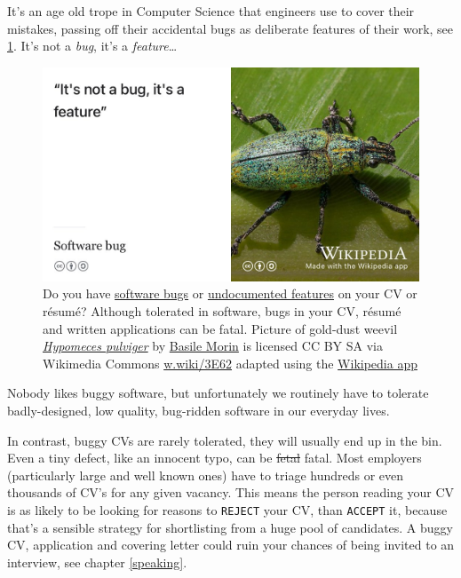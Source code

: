 \documentclass[
]{book}
\begin{document}
It's an age old trope in Computer Science that engineers use to cover their mistakes, passing off their accidental bugs as deliberate features of their work, see \ref{fig:notabug-fig}. It's not a \emph{bug}, it's a \emph{feature}\ldots{}

\begin{figure}

{\centering \includegraphics[width=0.99\linewidth]{images/notabug} 

}

\caption{Do you have \href{https://en.wikipedia.org/wiki/Software_bug}{software bugs} or \href{https://en.wikipedia.org/wiki/Undocumented_feature}{undocumented features} on your CV or résumé? Although tolerated in software, bugs in your CV, résumé and written applications can be fatal. Picture of gold-dust weevil \emph{\href{https://en.wikipedia.org/wiki/Hypomeces_pulviger}{Hypomeces pulviger}} by \href{https://commons.wikimedia.org/wiki/User:Basile_Morin}{Basile Morin} is licensed CC BY SA via Wikimedia Commons \href{https://w.wiki/3E62}{w.wiki/3E62} adapted using the \href{https://apps.apple.com/us/app/wikipedia/id324715238}{Wikipedia app}}\label{fig:notabug-fig}
\end{figure}



Nobody likes buggy software, but unfortunately we routinely have to tolerate badly-designed, low quality, bug-ridden software in our everyday lives. \citep{badsoftware, failware}

In contrast, buggy CVs are rarely tolerated, they will usually end up in the bin. Even a tiny defect, like an innocent typo, can be \sout{fetal} fatal. Most employers (particularly large and well known ones) have to triage hundreds or even thousands of CV's for any given vacancy. This means the person reading your CV is as likely to be looking for reasons to \texttt{REJECT} your CV, than \texttt{ACCEPT} it, because that's a sensible strategy for shortlisting from a huge pool of candidates. A buggy CV, application and covering letter could ruin your chances of being invited to an interview, see chapter \ref{speaking}.
\end{document}
